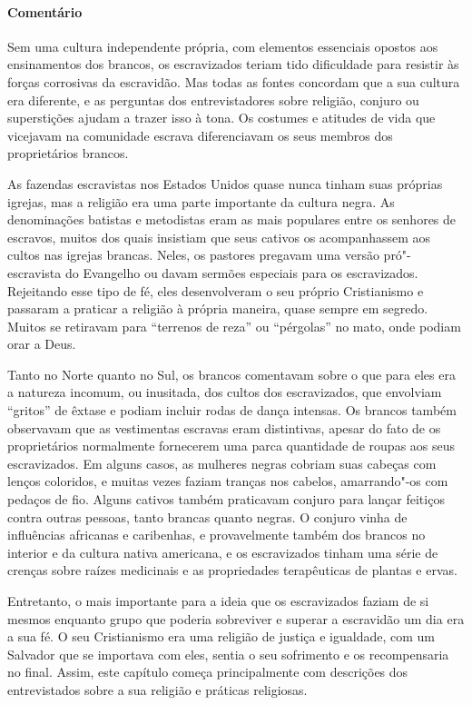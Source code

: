 \paragraph{Comentário}\quad
{\small
Sem uma cultura independente própria, com elementos essenciais
opostos aos ensinamentos dos brancos, os escravizados teriam tido
dificuldade para resistir às forças corrosivas da escravidão. Mas todas
as fontes concordam que a sua cultura era diferente, e as perguntas dos
entrevistadores sobre religião, conjuro ou superstições ajudam a trazer
isso à tona. Os costumes e atitudes de vida que vicejavam na comunidade
escrava diferenciavam os seus membros dos proprietários brancos.

As fazendas escravistas nos Estados Unidos quase nunca tinham suas
próprias igrejas, mas a religião era uma parte importante da cultura
negra. As denominações batistas e metodistas eram as mais populares
entre os senhores de escravos, muitos dos quais insistiam que seus
cativos os acompanhassem aos cultos nas igrejas brancas. Neles, os
pastores pregavam uma versão pró"-escravista do Evangelho ou davam
sermões especiais para os escravizados. Rejeitando esse tipo de fé,
eles desenvolveram o seu próprio Cristianismo e passaram a praticar
a religião à própria maneira, quase sempre em segredo. Muitos se retiravam para ``terrenos de reza'' ou ``pérgolas'' no mato, onde podiam orar a Deus.

Tanto no Norte quanto no Sul, os brancos comentavam sobre o que
para eles era a natureza incomum, ou inusitada, dos cultos dos escravizados,
que envolviam ``gritos'' de êxtase e podiam incluir rodas de dança
intensas. Os brancos também observavam que as vestimentas escravas
eram distintivas, apesar do fato de os proprietários normalmente
fornecerem uma parca quantidade de roupas aos seus escravizados. Em alguns
casos, as mulheres negras cobriam suas cabeças com lenços coloridos, e
muitas vezes faziam tranças nos cabelos, amarrando"-os com pedaços de
fio. Alguns cativos também praticavam conjuro para lançar feitiços
contra outras pessoas, tanto brancas quanto negras. O conjuro vinha de
influências africanas e caribenhas, e provavelmente também dos brancos
no interior e da cultura nativa americana, e os escravizados tinham uma
série de crenças sobre raízes medicinais e as propriedades terapêuticas
de plantas e ervas.

Entretanto, o mais importante para a ideia que os escravizados faziam
de si mesmos enquanto grupo que poderia sobreviver e superar a
escravidão um dia era a sua fé. O seu Cristianismo era uma
religião de justiça e igualdade, com um Salvador que se importava com
eles, sentia o seu sofrimento e os recompensaria no final. Assim, este
capítulo começa principalmente com descrições dos entrevistados sobre a
sua religião e práticas religiosas.
}

